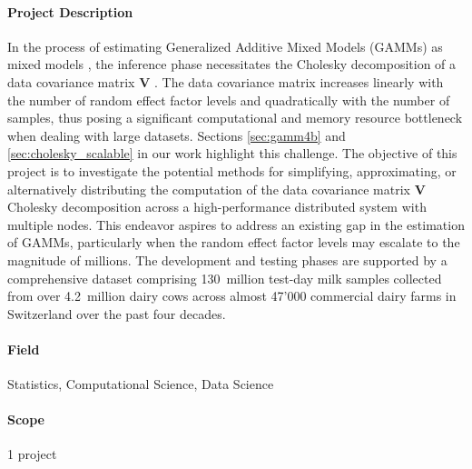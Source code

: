 \paragraph{Project Description} In the process of estimating Generalized Additive Mixed Models (GAMMs) as mixed models \citep{wood_stable_2004}, the inference phase necessitates the Cholesky decomposition of a data covariance matrix $\bm{V}$ \citep[page 289]{wood_generalized_2017}. The data covariance matrix increases linearly with the number of random effect factor levels and quadratically with the number of samples, thus posing a significant computational and memory resource bottleneck when dealing with large datasets. Sections \ref{sec:gamm4b} and \ref{sec:cholesky_scalable} in our work highlight this challenge. The objective of this project is to investigate the potential methods for simplifying, approximating, or alternatively distributing the computation of the data covariance matrix $\bm{V}$ Cholesky decomposition across a high-performance distributed system with multiple nodes. This endeavor aspires to address an existing gap in the estimation of GAMMs, particularly when the random effect factor levels may escalate to the magnitude of millions. The development and testing phases are supported by a comprehensive dataset comprising 130~million test-day milk samples collected from over 4.2~million dairy cows across almost 47'000 commercial dairy farms in Switzerland over the past four decades.

\paragraph{Field} Statistics, Computational Science, Data Science

\paragraph{Scope} 1 project

